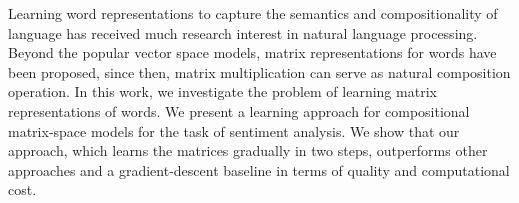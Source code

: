 Learning word representations to capture the semantics and compositionality of language has received much research interest in natural language processing. Beyond the popular vector space models, matrix representations for words have been proposed, since then, matrix multiplication can serve as natural composition operation. In this work, we investigate the problem of learning matrix representations of words. We present a learning approach for compositional matrix-space models for the task of sentiment analysis. We show that our approach, which learns the matrices gradually in two steps, outperforms other approaches and a gradient-descent baseline in terms of quality and computational cost.
